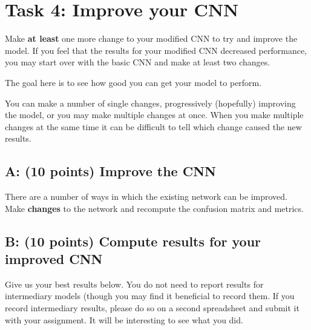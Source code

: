 \documentclass[11pt]{article}
\renewcommand\:{\colon} %
\begin{document}
\section{Task 4: Improve your CNN}

Make \textbf{at least} one more change to your modified CNN to try and improve the model.  If you feel that the results for your modified CNN decreased performance, you may start over with the basic CNN and make at least two changes.

The goal here is to see how good you can get your model to perform.

You can make a number of single changes, progressively (hopefully) improving the model, or you may make multiple changes at once. When you make multiple changes at the same time it can be difficult to tell which change caused the new results.

\subsection{A: (10 points) Improve the CNN}

There are a number of ways in which the existing network can be improved.  Make  \textbf{changes} to the network and recompute the confusion matrix and metrics.   


\subsection{B: (10 points) Compute results for your improved CNN}

Give us your best results below. You do not need to report results for intermediary models (though you may find it beneficial to record them. If you record intermediary results, please do so on a second spreadsheet and submit it with your assignment. It will be interesting to see what you did.
\end{document}

